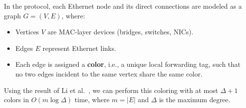 \documentclass[../../../OAE-SPEC-MAIN.tex]{subfiles}
\begin{document}
In the protocol, each Ethernet node and its direct connections are modeled as a graph $G = (V, E)$, where:

\begin{itemize}
    \item Vertices $V$ are MAC-layer devices (bridges, switches, NICs).
    \item Edges $E$ represent Ethernet links.
    \item Each edge is assigned a \textbf{color}, i.e., a unique local forwarding tag, such that no two edges incident to the same vertex share the same color.
\end{itemize}

Using the result of Li et al.~\cite{li2024vizing}, we can perform this coloring with at most $\Delta+1$ colors in $O(m \log \Delta)$ time, where $m = |E|$ and $\Delta$ is the maximum degree.
\end{document}
